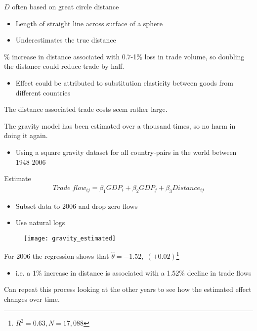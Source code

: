 \documentclass{beamer}
\begin{document}
\begin{frame}
  $D$ often based on great circle distance
    \begin{itemize}
      \item Length of straight line across surface of a sphere
      \item Underestimates the true distance
    \end{itemize}
    \% increase in distance associated with 0.7-1\% loss in trade volume, so doubling the distance could reduce trade by half. 
  \begin{itemize}
    \item Effect could be attributed to substitution elasticity between goods from different countries
  \end{itemize}
  \medskip
  The distance associated trade costs seem rather large.
\end{frame}

\begin{frame}
  The gravity model has been estimated over a thousand times, so no harm in doing it again.
  \begin{itemize}
    \item Using a square gravity dataset for all country-pairs in the world between 1948-2006
  \end{itemize} 
   Estimate
  \begin{align*}
    Trade \;flow_{ij} = \beta_1 GDP_i + \beta_2 GDP_j + \beta_3 Distance_{ij}
  \end{align*}
  \begin{itemize}
    \item Subset data to 2006 and drop zero flows
    \item Use natural logs
  \end{itemize}
\end{frame}


\begin{frame}
  \begin{figure}\centering
    \texttt{[image: gravity\_estimated]}
  \end{figure}
\end{frame}

\begin{frame}
  For 2006 the regression shows that $\hat{\theta}=-1.52, \; (\pm 0.02) $\footnote{$R^2=0.63, N=17,088$}
  \begin{itemize}
    \item i.e. a 1\% increase in distance is associated with a 1.52\% decline in trade flows
  \end{itemize}
  Can repeat this process looking at the other years to see how the estimated effect changes over time.  
\end{frame}
\end{document}

